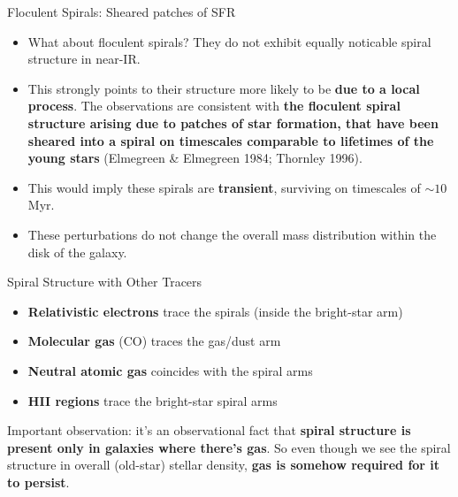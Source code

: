 \documentclass[letterpaper,landscape]{slides}
\begin{document}
\begin{slide}
\begin{center}
{\large \color{red} 
                  Floculent Spirals: Sheared patches of SFR  }
\end{center}

\begin{itemize}

\item What about floculent spirals? They do not exhibit equally noticable spiral structure in near-IR.

\item This strongly points to their structure more likely to be {\bf due to a local process}.
The observations are consistent with {\bf the floculent spiral
structure arising due to patches of star formation, that have been sheared into a 
spiral on timescales comparable to lifetimes of
the young stars} (Elmegreen \& Elmegreen 1984; Thornley 1996).

\item This would imply these spirals are {\bf transient}, surviving on timescales of $\sim 10$Myr.

\item These perturbations do not change the overall mass distribution within the disk of the galaxy.

\end{itemize}

\vfill
\end{slide}


\begin{slide}
\begin{center}
{\large \color{red} 
                  Spiral Structure with Other Tracers  }
\end{center}

\begin{itemize}
\item {\bf Relativistic electrons} trace the spirals (inside the bright-star arm)
\item {\bf Molecular gas} (CO) traces the gas/dust arm
\item {\bf Neutral atomic gas} coincides with the spiral arms
\item {\bf HII regions} trace the bright-star spiral arms
\end{itemize}

Important observation: it's an observational fact that {\bf spiral structure
is present only in galaxies where there's gas}. So even though we see the spiral
structure in overall (old-star) stellar density, {\bf gas is somehow required
for it to persist}.

\vfill
\end{slide}
\end{document}
